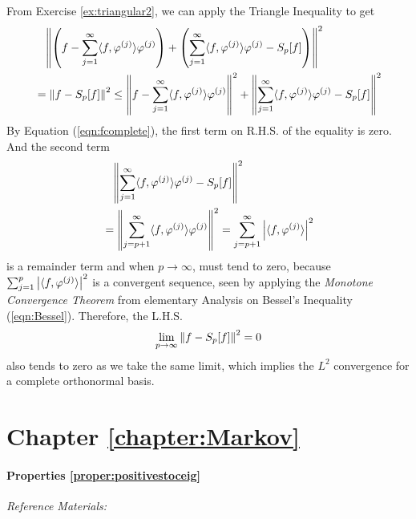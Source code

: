 From Exercise \ref{ex:triangular2}, we can apply the Triangle Inequality to get
\begin{align}
&\quad \norm{\left(f - \sum_{j=1}^{\infty} \langle f, \varphi^{(j)} \rangle \varphi^{(j)}\right) + \left(\sum_{j=1}^{\infty} \langle f, \varphi^{(j)} \rangle \varphi^{(j)} - S_p[f]\right)}^2 \nonumber \\
&= \norm{f - S_p[f]}^2 \leq \norm{f - \sum_{j=1}^{\infty} \langle f, \varphi^{(j)} \rangle \varphi^{(j)}}^2 + \norm{\sum_{j=1}^{\infty} \langle f, \varphi^{(j)} \rangle \varphi^{(j)} - S_p[f]}^2
\end{align}
By Equation (\ref{eqn:fcomplete}), the first term on R.H.S. of the equality is zero. And the second term
\begin{align}
&\quad \norm{\sum_{j=1}^{\infty} \langle f, \varphi^{(j)} \rangle \varphi^{(j)} - S_p[f]}^2 \nonumber \\
&= \norm{\sum_{j=p+1}^{\infty} \langle f, \varphi^{(j)} \rangle \varphi^{(j)}}^2 = \sum_{j=p+1}^{\infty} \abs{\langle f, \varphi^{(j)} \rangle}^2
\end{align}
is a remainder term and when $p \to \infty$, must tend to zero, because $\sum_{j=1}^{p} \abs{\langle f, \varphi^{(j)} \rangle}^2$ is a convergent sequence, seen by applying the \textit{Monotone Convergence Theorem} from elementary Analysis on Bessel's Inequality (\ref{eqn:Bessel}). Therefore, the L.H.S.
\begin{align}
\lim_{p \to \infty}\norm{f - S_p[f]}^2 = 0
\end{align}
also tends to zero as we take the same limit, which implies the $L^2$ convergence for a complete orthonormal basis.

\section{Chapter \ref*{chapter:Markov}}
\label{section:Markovappend}

\paragraph{Properties \ref*{proper:positivestoceig}}

\textit{Reference Materials: \cite{markov}}

